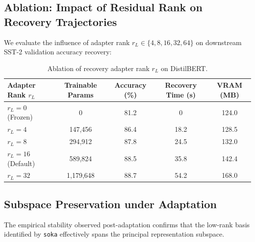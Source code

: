 \subsection{Ablation: Impact of Residual Rank on Recovery Trajectories}
We evaluate the influence of adapter rank $r_L \in \{4, 8, 16, 32, 64\}$ on downstream SST-2 validation accuracy recovery:
\begin{table}[H]
\centering
\small
\begin{tabular}{lcccc}
\toprule
\textbf{Adapter Rank $r_L$} & \textbf{Trainable Params} & \textbf{Accuracy (\%)} & \textbf{Recovery Time (s)} & \textbf{VRAM (MB)} \\
\midrule
$r_L = 0$ (Frozen) & 0 & 81.2 & 0 & 124.0 \\
$r_L = 4$ & 147,456 & 86.4 & 18.2 & 128.5 \\
$r_L = 8$ & 294,912 & 87.8 & 24.5 & 132.0 \\
$r_L = 16$ (Default) & 589,824 & 88.5 & 35.8 & 142.4 \\
$r_L = 32$ & 1,179,648 & 88.7 & 54.2 & 168.0 \\
\bottomrule
\end{tabular}
\caption{Ablation of recovery adapter rank $r_L$ on DistilBERT.}
\label{tab:ablation_adapter_rank}
\end{table}

\subsection{Subspace Preservation under Adaptation}
The empirical stability observed post-adaptation confirms that the low-rank basis identified by \texttt{soka} effectively spans the principal representation subspace.

